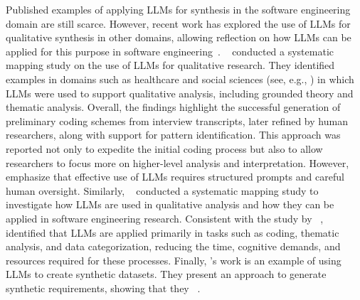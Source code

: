 Published examples of applying LLMs for synthesis in the software engineering domain are still scarce.
However, recent work has explored the use of LLMs for qualitative synthesis in other domains, allowing reflection on how LLMs can be applied for this purpose in software engineering~\cite{DBLP:journals/ase/BanoHZT24}.
\citeauthor{barros2024largelanguagemodelqualitative}~\cite{barros2024largelanguagemodelqualitative} conducted a systematic mapping study on the use of LLMs for qualitative research.
They identified examples in domains such as healthcare and social sciences (see, e.g., \cite{de2024performing,mathis2024inductive}) in which LLMs were used to support qualitative analysis, including grounded theory and thematic analysis.
Overall, the findings highlight the successful generation of preliminary coding schemes from interview transcripts, later refined by human researchers, along with support for pattern identification.
This approach was reported not only to expedite the initial coding process but also to allow researchers to focus more on higher-level analysis and interpretation.
However, \citeauthor{barros2024largelanguagemodelqualitative} emphasize that effective use of LLMs requires structured prompts and careful human oversight.
Similarly, \citeauthor{leça2024applicationsimplicationslargelanguage}~\cite{leça2024applicationsimplicationslargelanguage} conducted a systematic mapping study to investigate how LLMs are used in qualitative analysis and how they can be applied in software engineering research.
Consistent with the study by \citeauthor{barros2024largelanguagemodelqualitative}~\cite{barros2024largelanguagemodelqualitative}, \citeauthor{leça2024applicationsimplicationslargelanguage} identified that LLMs are applied primarily in tasks such as coding, thematic analysis, and data categorization, reducing the time, cognitive demands, and resources required for these processes.
Finally, \citeauthor{DBLP:journals/corr/abs-2506-21138}'s work is an example of using LLMs to create synthetic datasets.
They present an approach to generate synthetic requirements, showing that they ~\cite{DBLP:journals/corr/abs-2506-21138}.


